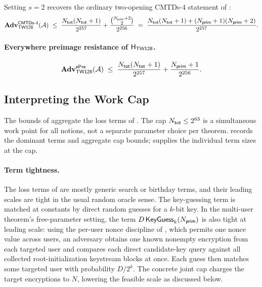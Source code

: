 \begin{remark}
\label{rem:cmtd4-s2}
Setting $s = 2$ recovers the ordinary two-opening
CMTDs-4 statement of \cite{BH22}:
\[
  \mathbf{Adv}^{\mathsf{CMTDs}\text{-}4}_{\textsf{TW128}}(\mathcal{A})
  \;\leq\;
  \frac{N_{\mathsf{tot}}(N_{\mathsf{tot}} + 1)}{2^{257}}
  + \frac{\binom{N_{\mathsf{prim}} + 2}{2}}{2^{256}}
  \;=\;
  \frac{N_{\mathsf{tot}}(N_{\mathsf{tot}} + 1) + (N_{\mathsf{prim}} + 1)(N_{\mathsf{prim}} + 2)}{2^{257}}.
\]
\end{remark}

\paragraph{Everywhere preimage resistance of $\mathsf{H}_{\mathsf{TW128}}$.}
\[
  \mathbf{Adv}^{\mathsf{ePre}}_{\textsf{TW128}}(\mathcal{A})
  \;\leq\;
  \frac{N_{\mathsf{tot}}(N_{\mathsf{tot}} + 1)}{2^{257}}
  + \frac{N_{\mathsf{prim}} + 1}{2^{256}}.
\]

\subsection{Interpreting the Work Cap}
\label{sec:bound-discussion}

The bounds of  aggregate the loss terms of
. The cap $N_{\mathsf{tot}} \leq 2^{63}$ is a simultaneous
work point for all notions, not a separate parameter choice per theorem.
 records the dominant terms and aggregate cap
bounds;  supplies the individual term sizes at
the cap.

\paragraph{Term tightness.}
The loss terms of  are mostly generic search or birthday
terms, and their leading scales are tight in the usual random oracle sense. The
key-guessing term is matched at constants by direct random guesses for a
$k$-bit key. In the multi-user theorem's free-parameter setting, the term
$D\,\mathsf{KeyGuess}_k(N_{\mathsf{prim}})$ is also tight at leading scale: using the per-user
nonce discipline of , which permits one nonce value across
users, an adversary obtains one known nonempty encryption from each targeted
user and compares each direct candidate-key query against all collected
root-initialization keystream blocks at once. Each guess then matches some
targeted user with probability $D/2^k$. The concrete joint cap charges the
target encryptions to $N$, lowering the feasible scale as discussed below.

